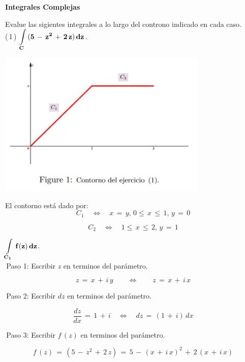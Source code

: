 \documentclass[a4paper,11pt,openany]{book}
\begin{document}
\newpage


\graphicspath{ {images/} }

\begin{center}
\textbf{Integrales Complejas}
\end{center}

Evalue las sigientes integrales a lo largo del controno indicado en cada caso.\\

\textcolor{ao(english)}{(\,1\,)} $\bf{\displaystyle\int\limits_{C}\,(5\,-\,z^{2}\,+\,2\,z)\,dz}$.

\begin{center}
     \includegraphics[width=10cm]{figura-1.JPG}
\end{center}

El contorno está dado por:\\

$$C_{1} \quad\iff\quad x\,=\,y,\,0\leq\,x\,\leq\,1,\,y\,=\,0$$

$$C_{2} \quad\iff\quad 1\leq\,x\,\leq\,2,\,y\,=\,1$$

$\bf{\displaystyle\int\limits_{C_{1}}\,f(z)\,dz}$.\\

\textcolor{ao(english)}{\,Paso 1:} Escribir $z$ en terminos del parámetro.

$$z\,=\,x\,+\,i\,y \qquad\iff\qquad z\,=\,x\,+\,i\,x$$

\textcolor{ao(english)}{\,Paso 2:} Escribir $dz$ en terminos del parámetro.

$$\dfrac{dz}{dx}\,=\,1\,+\,i \quad\iff\quad dz\,=\,(1\,+\,i)\,dx$$

\textcolor{ao(english)}{\,Paso 3:} Escribir $f\,(z)$ en terminos del parámetro.

$$f\,(z)\,=\,(5\,-\,z^{2}\,+\,2\,z)\,=\,5\,-\,(x\,+\,i\,x)^{2}\,+\,2\,(x\,+\,i\,x)$$
\end{document}

